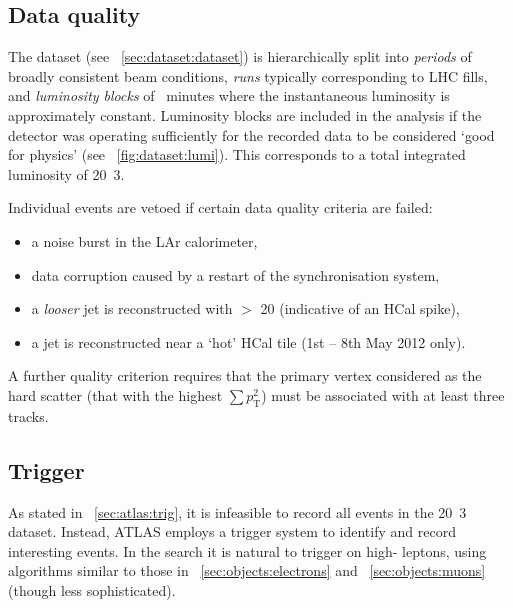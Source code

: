 
\subsection{Data quality}
\label{sec:selection:quality}

The \pp dataset (see \Section~\ref{sec:dataset:dataset}) is hierarchically split into 
\textit{periods} of broadly consistent beam conditions, \textit{runs} typically 
corresponding to LHC fills, and \textit{luminosity blocks} of ~minutes where the 
instantaneous luminosity is approximately constant. Luminosity blocks are included in the 
analysis if the detector was operating sufficiently for the recorded data to be considered 
`good for physics' (see \Figure~\ref{fig:dataset:lumi}). This corresponds to a total 
integrated luminosity of \unit{20.3}{\invfb}.

Individual events are vetoed if certain data quality criteria are failed:
\begin{itemize}[noitemsep,nolistsep]
	\item a noise burst in the LAr calorimeter,
	\item data corruption caused by a restart of the synchronisation system,
	\item a \textit{looser} jet is reconstructed with \pt $>$ \unit{20}{\GeV} (indicative of an HCal spike),
	\item a jet is reconstructed near a `hot' HCal tile (1st -- 8th May 2012 only).
\end{itemize}
A further quality criterion requires that the primary vertex considered as the hard 
scatter (that with the highest $\sum p_{\text{T}}^2$) must be associated with at least 
three tracks.



\subsection{Trigger}
\label{sec:selection:trigger}

As stated in \Section~\ref{sec:atlas:trig}, it is infeasible to record all events in the 
\unit{20.3}{\invfb} dataset. Instead, ATLAS employs a trigger system to identify and 
record interesting events. In the \HWWlvlv search it is natural to trigger on high-\pt 
leptons, using algorithms similar to those in \Section~\ref{sec:objects:electrons} and 
\Section~\ref{sec:objects:muons} (though less sophisticated).

